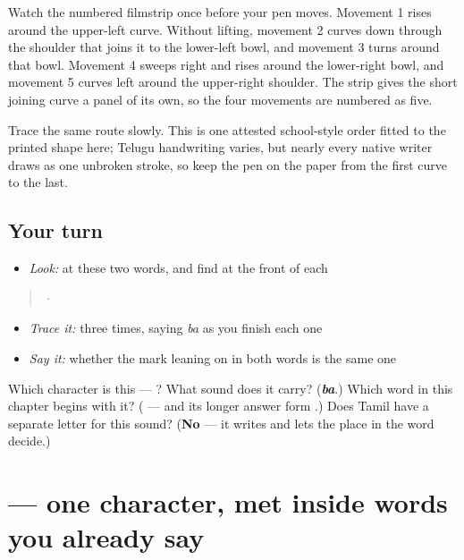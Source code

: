 Watch the numbered filmstrip once before your pen moves. Movement 1 rises around the upper-left curve. Without lifting, movement 2 curves down through the shoulder that joins it to the lower-left bowl, and movement 3 turns around that bowl. Movement 4 sweeps right and rises around the lower-right bowl, and movement 5 curves left around the upper-right shoulder. The strip gives the short joining curve a panel of its own, so the four movements are numbered as five.

Trace the same route slowly. This is one attested school-style order fitted to the printed shape here; Telugu handwriting varies, but nearly every native writer draws  as one unbroken stroke, so keep the pen on the paper from the first curve to the last.

\subsection*{Your turn}
\begin{itemize}
\raggedright
  \item \emph{Look:} at these two words, and find  at the front of each
\end{itemize}

\begin{quote}
  ·  
\end{quote}

\begin{itemize}
\raggedright
  \item \emph{Trace it:}  three times, saying \emph{ba} as you finish each one
  \item \emph{Say it:} whether the mark leaning on  in both words is the same one
\end{itemize}

\begin{tcolorbox}[breakable,colback=teal!4,colframe=teal!35!black,title={Before you move on}]
Which character is this — ? What sound does it carry? (\emph{\textbf{ba}}.) Which word in this chapter begins with it? (\textbf{} — and its longer answer form \textbf{}.) Does Tamil have a separate letter for this sound? (\textbf{No} — it writes  and lets the place in the word decide.)
\end{tcolorbox}
\section[\texorpdfstring{\te{ర} (ra)}{ర (ra)}]{ — one character, met inside words you already say}


